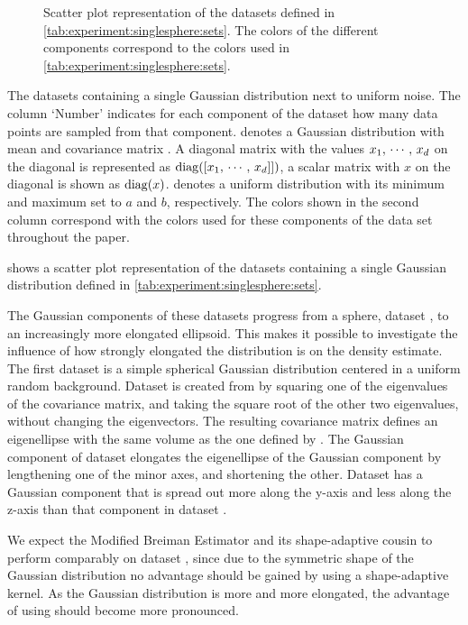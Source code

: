 
\begin{figure*}
	\centering
	
	\caption{Scatter plot representation of the datasets defined in \cref{tab:experiment:singlesphere:sets}. The colors of the different components correspond to the colors used in \cref{tab:experiment:singlesphere:sets}.}
	\label{fig:experiment:singlesphere:sets}
\end{figure*}

\begin{table*}
	\centering
	
	\caption{The datasets containing a single Gaussian distribution next to uniform noise. The column `Number' indicates for each component of the dataset how many data points are sampled from that component. \gaussDist{\varMean}{\varCovarianceMatrix} denotes a Gaussian distribution with mean \varMean and covariance matrix \varCovarianceMatrix. A diagonal matrix with the values $x_1,\, \cdots,\, x_d$ on the diagonal is represented as $\operatorname{diag}([x_1,\,\cdots,\,x_d]])$, a scalar matrix with $x$ on the diagonal is shown as $\operatorname{diag}(x)$.  denotes a uniform distribution with its minimum and maximum set to $a$ and $b$, respectively. The colors shown in the second column correspond with the colors used for these components of the data set throughout the paper.} 	
	\label{tab:experiment:singlesphere:sets}
\end{table*}

 shows a scatter plot representation of the datasets containing a single Gaussian distribution defined in \cref{tab:experiment:singlesphere:sets}. 

The Gaussian components of these datasets progress from a sphere, \ie dataset \ferdosiOne, to an increasingly more elongated ellipsoid. This makes it possible to investigate the influence of how strongly elongated the distribution is on the density estimate. 
	The first dataset is a simple spherical Gaussian distribution centered in a uniform random background. 
	Dataset \baakmanOne is created from \ferdosiOne by squaring one of the eigenvalues of the covariance matrix, and taking the square root of the other two eigenvalues, without changing the eigenvectors. The resulting covariance matrix defines an eigenellipse with the same volume as the one defined by \ferdosiOne.
	The Gaussian component of dataset \baakmanFour elongates the eigenellipse of the Gaussian component by lengthening one of the minor axes, and shortening the other.
	Dataset \baakmanFive has a Gaussian component that is spread out more along the y-axis and less along the z-axis than that component in dataset \baakmanFour. 

	We expect the Modified Breiman Estimator and its shape-adaptive cousin to perform comparably on dataset \ferdosiOne, since due to the symmetric shape of the Gaussian distribution no advantage should be gained by using a shape-adaptive kernel. 
	As the Gaussian distribution is more and more elongated, the advantage of using \sambe should become more pronounced. 